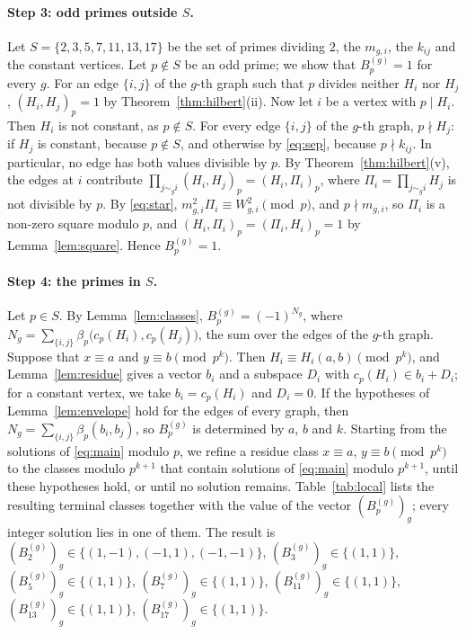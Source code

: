 \documentclass[11pt]{article}
\begin{document}
\paragraph{Step 3: odd primes outside $S$.} Let $S=\{2,3,5,7,11,13,17\}$ be the set of primes dividing $2$, the $m_{g,i}$, the $k_{ij}$ and the constant vertices. Let $p\notin S$ be an odd prime; we show that $B^{(g)}_p=1$ for every $g$. For an edge $\{i,j\}$ of the $g$-th graph such that $p$ divides neither $H_i$ nor $H_j$, $(H_i,H_j)_p=1$ by Theorem~\ref{thm:hilbert}(ii). Now let $i$ be a vertex with $p\mid H_i$. Then $H_i$ is not constant, as $p\notin S$. For every edge $\{i,j\}$ of the $g$-th graph, $p\nmid H_j$: if $H_j$ is constant, because $p\notin S$, and otherwise by \eqref{eq:sep}, because $p\nmid k_{ij}$. In particular, no edge has both values divisible by $p$. By Theorem~\ref{thm:hilbert}(v), the edges at $i$ contribute $\prod_{j\sim_g i}(H_i,H_j)_p=(H_i,\Pi_i)_p$, where $\Pi_i=\prod_{j\sim_g i}H_j$ is not divisible by $p$. By \eqref{eq:star}, $m_{g,i}^2\Pi_i\equiv W_{g,i}^2\pmod p$, and $p\nmid m_{g,i}$, so $\Pi_i$ is a non-zero square modulo $p$, and $(H_i,\Pi_i)_p=(\Pi_i,H_i)_p=1$ by Lemma~\ref{lem:square}. Hence $B^{(g)}_p=1$.

\paragraph{Step 4: the primes in $S$.} Let $p\in S$. By Lemma~\ref{lem:classes}, $B^{(g)}_p=(-1)^{N_g}$, where $N_g=\sum_{\{i,j\}}\beta_p\bigl(c_p(H_i),c_p(H_j)\bigr)$, the sum over the edges of the $g$-th graph. Suppose that $x\equiv a$ and $y\equiv b\pmod{p^k}$. Then $H_i\equiv H_i(a,b)\pmod{p^k}$, and Lemma~\ref{lem:residue} gives a vector $b_i$ and a subspace $D_i$ with $c_p(H_i)\in b_i+D_i$; for a constant vertex, we take $b_i=c_p(H_i)$ and $D_i=0$. If the hypotheses of Lemma~\ref{lem:envelope} hold for the edges of every graph, then $N_g=\sum_{\{i,j\}}\beta_p(b_i,b_j)$, so $B^{(g)}_p$ is determined by $a$, $b$ and $k$. Starting from the solutions of \eqref{eq:main} modulo $p$, we refine a residue class $x\equiv a$, $y\equiv b\pmod{p^k}$ to the classes modulo $p^{k+1}$ that contain solutions of \eqref{eq:main} modulo $p^{k+1}$, until these hypotheses hold, or until no solution remains. Table~\ref{tab:local} lists the resulting terminal classes together with the value of the vector $(B^{(g)}_p)_g$; every integer solution lies in one of them. The result is $(B^{(g)}_{2})_g\in\{(1,-1),\allowbreak (-1,1),\allowbreak (-1,-1)\}$, $(B^{(g)}_{3})_g\in\{(1,1)\}$, $(B^{(g)}_{5})_g\in\{(1,1)\}$, $(B^{(g)}_{7})_g\in\{(1,1)\}$, $(B^{(g)}_{11})_g\in\{(1,1)\}$, $(B^{(g)}_{13})_g\in\{(1,1)\}$, $(B^{(g)}_{17})_g\in\{(1,1)\}$.
\end{document}
